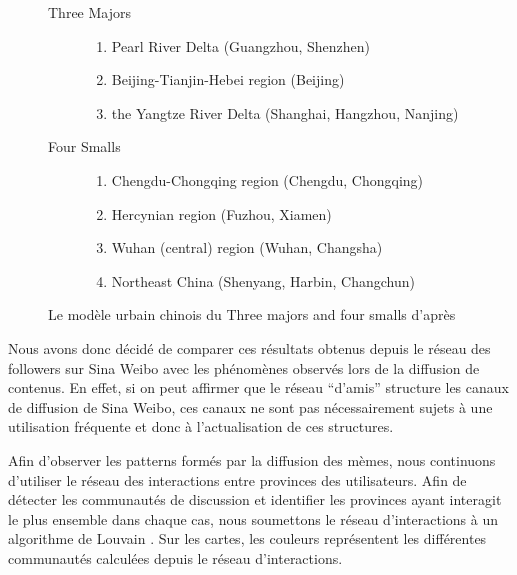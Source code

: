 \begin{figure}[H]
    \centering
    
    \begin{description}
    \item[Three Majors]
      \begin{enumerate}
      \item Pearl River Delta (Guangzhou, Shenzhen)
      \item Beijing-Tianjin-Hebei region (Beijing)
      \item the Yangtze River Delta (Shanghai, Hangzhou, Nanjing)
      \end{enumerate}

    \item[Four Smalls]
      \begin{enumerate}
      \item Chengdu-Chongqing region (Chengdu, Chongqing)
      \item Hercynian region (Fuzhou, Xiamen)
      \item Wuhan (central) region (Wuhan, Changsha)
      \item Northeast China (Shenyang, Harbin, Changchun)
      \end{enumerate}

    \end{description}

   \caption{
      Le mod\`ele urbain chinois du Three majors and four smalls d{\textquoteright}apr\`es \cite{Zhen2013}
    }
\end{figure}


Nous avons donc d\'ecid\'e de comparer ces r\'esultats obtenus depuis le r\'eseau des followers sur Sina Weibo avec les ph\'enom\`enes observ\'es lors de la diffusion de contenus. En effet, si on peut affirmer que le r\'eseau {\textquotedblleft}d{\textquoteright}amis{\textquotedblright} structure les canaux de diffusion de Sina Weibo, ces canaux ne sont pas n\'ecessairement sujets \`a une utilisation fr\'equente et donc \`a l{\textquoteright}actualisation de ces structures. 

Afin d{\textquoteright}observer les patterns form\'es par la diffusion des m\`emes, nous continuons d{\textquoteright}utiliser le r\'eseau des interactions entre provinces des utilisateurs. Afin de d\'etecter les communaut\'es de discussion et identifier les provinces ayant interagit le plus ensemble dans chaque cas, nous soumettons le r\'eseau d{\textquoteright}interactions \`a un algorithme de Louvain \citep{Blondel2008}. Sur les cartes, les couleurs repr\'esentent les diff\'erentes communaut\'es calcul\'ees depuis le r\'eseau d{\textquoteright}interactions. 

